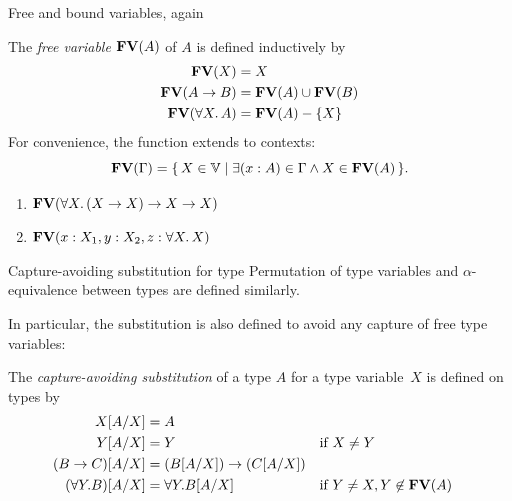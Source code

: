 \begin{frame}{Free and bound variables, again}
\begin{definition}
  The \emph{free variable} $\mathbf{FV}(A)$ of $A$ is defined inductively by
  \begin{align*}
    \mathbf{FV}(X)              & = X \\
    \mathbf{FV}(A \to B)        & = \mathbf{FV}(A) \cup \mathbf{FV}(B) \\
    \mathbf{FV}(\forall X.\, A) & = \mathbf{FV}(A) - \{X\}
  \end{align*}
  For convenience, the function extends to contexts:
  \[
    \mathbf{FV}(\Gamma) = \{\, X \in \mathbb{V}\mid \exists (x : A) \in \Gamma
      \wedge X \in \mathbf{FV}(A) \,\}.
  \]
\end{definition}
\begin{exercise*}

  \begin{enumerate}
    \item $\mathbf{FV}(\forall X.\, (X \to X) \to X \to X)$
    \item $\mathbf{FV}(x : X_1, y : X_2, z : \forall X.\,X)$
  \end{enumerate}
\end{exercise*}
\end{frame}

\begin{frame}{Capture-avoiding substitution for type}
  Permutation of type variables and $\alpha$-equivalence between types are defined similarly. 

  In particular, the substitution is also defined to avoid any capture of free type variables:
  \begin{definition}
  The \emph{capture-avoiding substitution} of a type $A$ for a type variable~$X$ is defined on types by 
  \begin{align*}
    X[{A}/{X}] & = A \\
    Y[{A}/{X}] & = Y && \text{if $X \neq Y$}\\
    (B \to C)[{A}/{X}] & = (B[{A}/{X}]) \to (C[{A}/{X}]) \\
    (\forall Y.B)[{A}/{X}] & = \forall Y. B[{A}/{X}] &&
    \text{if $Y \neq X, Y \not\in \mathbf{FV}(A)$} 
  \end{align*}
  \end{definition}
\end{frame}

